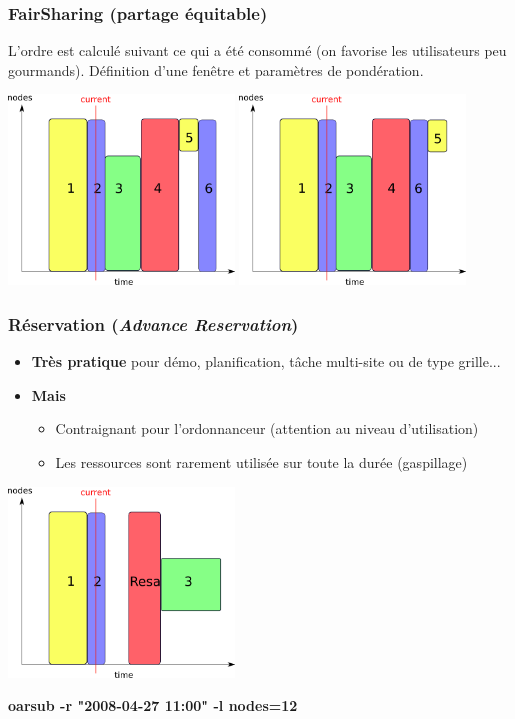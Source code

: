 \documentclass{beamer}
\begin{document}
\begin{frame}
	\frametitle{FairSharing (partage équitable)}
	L'ordre est calculé suivant ce qui a été consommé (on favorise les utilisateurs peu gourmands). Définition d'une fenêtre et paramètres de pondération.
	\begin{center}
		\includegraphics[width=6cm]{fifo.png}
		\includegraphics[width=6cm]{fairsharing.png}
	\end{center}
\end{frame}

\begin{frame}
	\frametitle{Réservation ({\em Advance Reservation})}

		\begin{itemize}
		\item {\bf Très pratique} pour démo, planification, tâche multi-site ou de type grille...
		\item {\bf Mais}
			\begin{itemize}
				\item Contraignant pour l'ordonnanceur (attention au niveau d'utilisation)
				\item Les ressources sont rarement utilisée sur toute la durée (gaspillage)
			\end{itemize}
		\end{itemize}

	\begin{center}
		\includegraphics[width=6cm]{resa.png}
	\end{center}
	{\bf oarsub -r "2008-04-27 11:00" -l nodes=12}

\end{frame}
\end{document}
